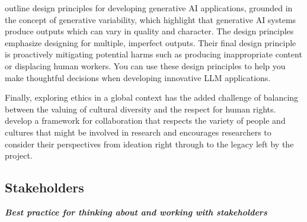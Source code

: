\citet{weisz_toward_2023} outline design principles for developing generative AI applications, grounded in the concept of generative variability, which highlight that generative AI systems produce outputs which can vary in quality and character. The design principles emphasize designing for multiple, imperfect outputs. Their final design principle is proactively mitigating potential harms such as producing inappropriate content or displacing human workers. You can use these design principles to help you make thoughtful decisions when developing innovative LLM applications.

Finally, exploring ethics in a global context has the added challenge of balancing between the valuing of cultural diversity and the respect for human rights. \citet{reid_ethics_2021} develop a framework for collaboration that respects the variety of people and cultures that might be involved in research and encourages researchers to consider their perspectives from ideation right through to the legacy left by the project. 

\subsection{Stakeholders}\label{sec:stakeholders}
\noindent\textbf{\textit{Best practice for thinking about and working with stakeholders}}\\

